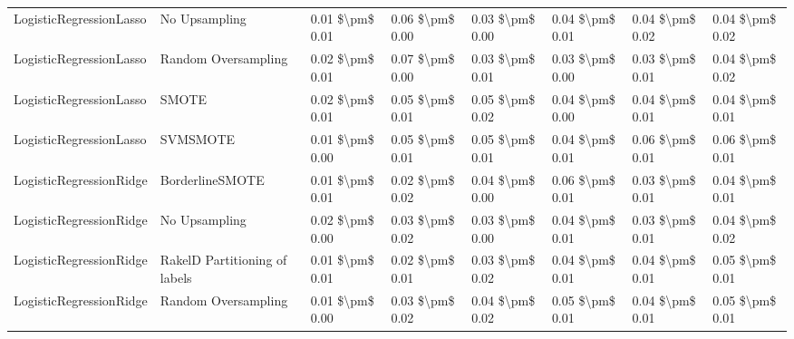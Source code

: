 \begin{tabular}{llllllll}
        LogisticRegressionLasso &                 No Upsampling & 0.01 \$\textbackslash pm\$ 0.01 &           0.06 \$\textbackslash pm\$ 0.00 &       0.03 \$\textbackslash pm\$ 0.00 &        0.04 \$\textbackslash pm\$ 0.01 &                         0.04 \$\textbackslash pm\$ 0.02 &     0.04 \$\textbackslash pm\$ 0.02 \\
        LogisticRegressionLasso &           Random Oversampling & 0.02 \$\textbackslash pm\$ 0.01 &           0.07 \$\textbackslash pm\$ 0.00 &       0.03 \$\textbackslash pm\$ 0.01 &        0.03 \$\textbackslash pm\$ 0.00 &                         0.03 \$\textbackslash pm\$ 0.01 &     0.04 \$\textbackslash pm\$ 0.02 \\
        LogisticRegressionLasso &                         SMOTE & 0.02 \$\textbackslash pm\$ 0.01 &           0.05 \$\textbackslash pm\$ 0.01 &       0.05 \$\textbackslash pm\$ 0.02 &        0.04 \$\textbackslash pm\$ 0.00 &                         0.04 \$\textbackslash pm\$ 0.01 &     0.04 \$\textbackslash pm\$ 0.01 \\
        LogisticRegressionLasso &                      SVMSMOTE & 0.01 \$\textbackslash pm\$ 0.00 &           0.05 \$\textbackslash pm\$ 0.01 &       0.05 \$\textbackslash pm\$ 0.01 &        0.04 \$\textbackslash pm\$ 0.01 &                         0.06 \$\textbackslash pm\$ 0.01 &     0.06 \$\textbackslash pm\$ 0.01 \\
        LogisticRegressionRidge &               BorderlineSMOTE & 0.01 \$\textbackslash pm\$ 0.01 &           0.02 \$\textbackslash pm\$ 0.02 &       0.04 \$\textbackslash pm\$ 0.00 &        0.06 \$\textbackslash pm\$ 0.01 &                         0.03 \$\textbackslash pm\$ 0.01 &     0.04 \$\textbackslash pm\$ 0.01 \\
        LogisticRegressionRidge &                 No Upsampling & 0.02 \$\textbackslash pm\$ 0.00 &           0.03 \$\textbackslash pm\$ 0.02 &       0.03 \$\textbackslash pm\$ 0.00 &        0.04 \$\textbackslash pm\$ 0.01 &                         0.03 \$\textbackslash pm\$ 0.01 &     0.04 \$\textbackslash pm\$ 0.02 \\
        LogisticRegressionRidge & RakelD Partitioning of labels & 0.01 \$\textbackslash pm\$ 0.01 &           0.02 \$\textbackslash pm\$ 0.01 &       0.03 \$\textbackslash pm\$ 0.02 &        0.04 \$\textbackslash pm\$ 0.01 &                         0.04 \$\textbackslash pm\$ 0.01 &     0.05 \$\textbackslash pm\$ 0.01 \\
        LogisticRegressionRidge &           Random Oversampling & 0.01 \$\textbackslash pm\$ 0.00 &           0.03 \$\textbackslash pm\$ 0.02 &       0.04 \$\textbackslash pm\$ 0.02 &        0.05 \$\textbackslash pm\$ 0.01 &                         0.04 \$\textbackslash pm\$ 0.01 &     0.05 \$\textbackslash pm\$ 0.01 \\

\end{tabular}
